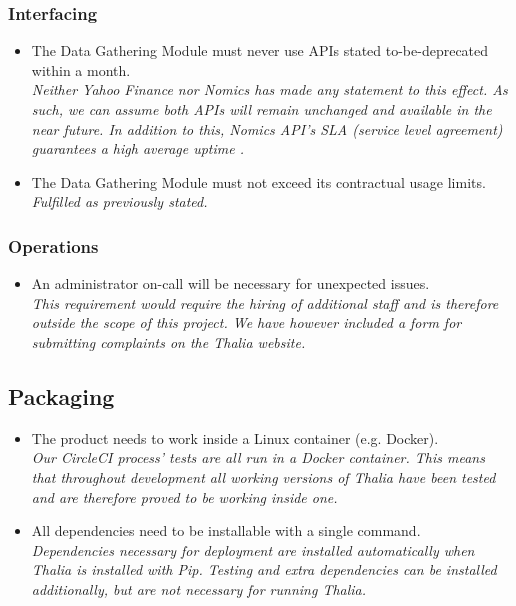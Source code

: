 \documentclass[main.tex]{subfiles}
\begin{document}
\subsubsection{Interfacing}
\begin{itemize}

\item The Data Gathering Module must never use APIs stated to-be-deprecated within a month.\\
\textit{Neither Yahoo Finance nor Nomics has made any statement to this effect. As such, we can assume both APIs will remain unchanged and available in the near future. In addition to this, Nomics API’s SLA (service level agreement) guarantees a high average uptime \cite{nomicsAPISpec}.}
\item The Data Gathering Module must not exceed its contractual usage limits.\\
\textit{Fulfilled as previously stated.}

\end{itemize}

\subsubsection{Operations}
\begin{itemize}

\item An administrator on-call will be necessary for unexpected issues.\\
\textit{This requirement would require the hiring of additional staff and is therefore outside the scope of this project. We have however included a form for submitting complaints on the Thalia website.}

\end{itemize}

\subsection{Packaging}
\begin{itemize}
\item The product needs to work inside a Linux container (e.g. Docker).\\
\textit{Our CircleCI process’ tests are all run in a Docker container. This means that throughout development all working versions of Thalia have been tested and are therefore proved to be working inside one.}
\item All dependencies need to be installable with a single command.\\
\textit{Dependencies necessary for deployment are installed automatically when Thalia is installed with Pip. Testing and extra dependencies can be installed additionally, but are not necessary for running Thalia.}
\end{itemize}
\end{document}
